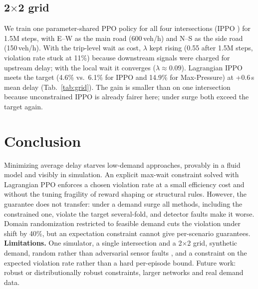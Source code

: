 \documentclass{article}
\begin{document}
\subsection{2$\times$2 grid}\label{sec:grid}
We train one parameter-shared PPO policy for all four intersections (IPPO
\cite{deWittGMMTSW20,YuVVGWBW22}) for 1.5M steps, with E--W as the main road (600\,veh/h) and
N--S as the side road (150\,veh/h). With the trip-level wait as cost, $\lambda$ kept rising
(0.55 after 1.5M steps, violation rate stuck at 11\%) because downstream signals were charged
for upstream delay; with the local wait it converges ($\lambda\approx0.09$).
Lagrangian IPPO meets the target (4.6\% vs.\ 6.1\% for IPPO and 14.9\% for Max-Pressure) at
+0.6\,s mean delay (Tab.~\ref{tab:grid}). The gain is smaller than on one intersection
because unconstrained IPPO is already fairer here; under surge both exceed the target again.

\begin{table}[t]
\centering
\caption{2$\times$2 grid (local violation rate, $T=90$\,s). RL: mean $\pm$ std over 3 training
seeds; baselines: mean of 3 evaluation episodes. All methods see asym in training only.}
\label{tab:grid}
\resizebox{\columnwidth}{!}{}
\end{table}

\section{Conclusion}
Minimizing average delay starves low-demand approaches, provably in a fluid model and
visibly in simulation. An explicit max-wait constraint solved with Lagrangian PPO enforces a
chosen violation rate at a small efficiency cost and without the tuning fragility of reward
shaping or structural rules. However, the guarantee does not transfer: under a demand surge
all methods, including the constrained one, violate the target several-fold, and detector
faults make it worse. Domain randomization restricted to feasible demand cuts the violation
under shift by 40\%, but an expectation constraint cannot give per-scenario guarantees.
\textbf{Limitations.} One simulator, a single intersection and a 2$\times$2 grid, synthetic
demand, random rather than adversarial sensor faults \cite{ZhangCXLLBH20}, and a constraint on
the expected violation rate rather than a hard per-episode bound. Future work: robust or
distributionally robust constraints, larger networks and real demand data.
\end{document}
